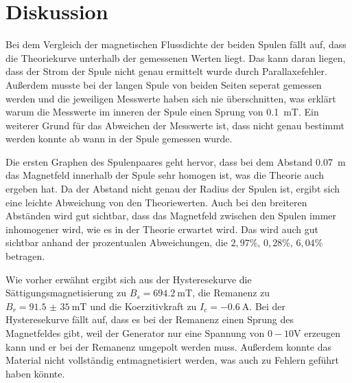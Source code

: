 \section{Diskussion}

Bei dem Vergleich der magnetischen Flussdichte der beiden Spulen fällt auf, dass
die Theoriekurve unterhalb der gemessenen Werten liegt. Das kann daran liegen, dass
der Strom der Spule nicht genau ermittelt wurde durch Parallaxefehler. Außerdem
musste bei der langen Spule von beiden Seiten seperat gemessen werden und die jeweiligen
Messwerte haben sich nie überschnitten, was erklärt warum die Messwerte im inneren
der Spule einen Sprung von \SI{0.1}{\milli\tesla}. Ein weiterer Grund für das Abweichen der
Messwerte ist, dass nicht genau bestimmt werden konnte ab wann in der Spule gemessen wurde.

Die ersten Graphen des Spulenpaares geht hervor, dass bei dem Abstand \SI{0.07}{\meter}
das Magnetfeld innerhalb der Spule sehr homogen ist, was die Theorie auch ergeben hat.
Da der Abstand nicht genau der Radius der Spulen ist, ergibt sich eine leichte Abweichung
von den Theoriewerten. Auch bei den breiteren Abständen wird gut sichtbar, dass
das Magnetfeld zwischen den Spulen immer inhomogener wird, wie es in der Theorie
erwartet wird. Das wird auch gut sichtbar anhand der prozentualen Abweichungen, die
$2,97 \% ,\, 0,28\% ,\, 6,04 \%$ betragen.

Wie vorher erwähnt ergibt sich aus der Hysteresekurve die Sättigungsmagnetisierung
zu $B_s = \SI{694.2}{\milli\tesla}$, die Remanenz zu $B_r = \SI{91.5(350)}{\milli\tesla}$ und
die Koerzitivkraft zu $I_c = \SI{-0.6}{\ampere}$.
Bei der Hysteresekurve fällt auf, dass es bei der Remanenz einen Sprung des Magnetfeldes
gibt, weil der Generator nur eine Spannung von $0-10\si{\volt}$ erzeugen kann und
er bei der Remanenz umgepolt werden muss. Außerdem konnte das Material nicht vollständig
entmagnetisiert werden, was auch zu Fehlern geführt haben könnte.
